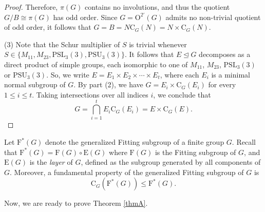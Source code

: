 \documentclass[10pt]{article}
\begin{document}
\begin{proof}
Therefore, $\pi(G)$ contains no involutions, and thus the quotient $G/B\cong \pi(G)$ has odd order. Since $G = \mathrm{O}^{2'}(G)$ admits no non-trivial quotient of odd order, it follows that $G = B =N\mathrm{C}_G(N) = N \times \mathrm{C}_G(N)$.


 
  (3) Note that the Schur multiplier of $S$ is trivial whenever $S\in \{ M_{11},M_{23}, \mathrm{PSL}_{3}(3),\mathrm{PSU}_{3}(3) \}$.
It follows that $E \unlhd G$ decomposes as a direct product of simple groups, each isomorphic to one of $M_{11}$, $M_{23}$, $\mathrm{PSL}_3(3)$ or $\mathrm{PSU}_3(3)$.
  So, we write $E = E_1 \times E_2 \times \cdots \times E_t$, where each $E_i$ is a minimal normal subgroup of $G$.
  By part (2), we have $G=E_i\times \mathrm{C}_{G}(E_i)$ for every $1\leq i\leq t$.
  Taking intersections over all indices $i$, we conclude that
  $$G=\bigcap_{i=1}^{t} E_i \mathrm{C}_{G}(E_i)=E \times \mathrm{C}_{G}(E).$$ 
\end{proof}


Let $\mathrm{F}^*(G)$ denote the generalized Fitting subgroup of a finite group $G$.
Recall that $\mathrm{F}^*(G)=\mathrm{F}(G)\circ \mathrm{E}(G)$ where $\mathrm{F}(G)$ is the Fitting subgroup of $G$,
and $\mathrm{E}(G)$ is the \emph{layer} of $G$,
defined as the subgroup generated by all components of $G$.
Moreover, a fundamental property of the generalized Fitting subgroup of $G$
is 
$$\mathrm{C}_{G}(\mathrm{F}^*(G))\leq \mathrm{F}^*(G).$$



Now, we are ready to prove Theorem \ref{thmA}.
\end{document}
